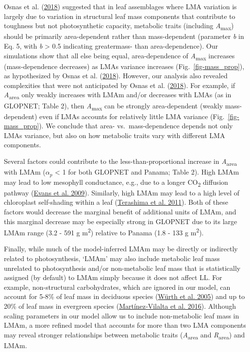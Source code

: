 \documentclass[
  12pt,
  letterpaper,
  DIV=11,
  numbers=noendperiod]{scrartcl}
\begin{document}
Osnas et al. (\protect\hyperlink{ref-Osnas2018}{2018}) suggested that in
leaf assemblages where LMA variation is largely due to variation in
structural leaf mass components that contribute to toughness but not
photosynthetic capacity, metabolic traits (including
\emph{A}\textsubscript{max}) should be primarily area-dependent rather
than mass-dependent (parameter \emph{b} in Eq. 5, with \emph{b}
\textgreater{} 0.5 indicating greatermass- than area-dependence). Our
simulations show that all else being equal, area-dependence of
\emph{A}\textsubscript{max} increases (mass-dependence decreases) as
LMAs variance increases (Fig.~\ref{fig-mass_prop}), as hypothesized by
Osnas et al. (\protect\hyperlink{ref-Osnas2018}{2018}). However, our
analysis also revealed complexities that were not anticipated by Osnas
et al. (\protect\hyperlink{ref-Osnas2018}{2018}). For example, if
\emph{A}\textsubscript{area} only weakly increases with LMAm and/or
decreases with LMAs (as in GLOPNET; Table 2), then
\emph{A}\textsubscript{max} can be strongly area-dependent (weakly
mass-dependent) even if LMAs accounts for relatively little LMA variance
(Fig.~\ref{fig-mass_prop}). We conclude that area- vs.~mass-dependence
depends not only LMAs variance, but also on how metabolic traits vary
with different LMA components.

Several factors could contribute to the less-than-proportional increase
in \emph{A}\textsubscript{area} with LMAm (\(\alpha_p\) \textless{} 1
for both GLOPNET and Panama; Table 2). High LMAm may lead to low
mesophyll conductance, e.g., due to a longer CO\textsubscript{2}
diffusion pathway (\protect\hyperlink{ref-Evans2009}{Evans et al.
2009}). Similarly, high LMAm may lead to a high level of chloroplast
self-shading within a leaf
(\protect\hyperlink{ref-Terashima2011}{Terashima et al. 2011}). Both of
these factors would decrease the marginal benefit of additional units of
LMAm, and this marginal decrease may be especially strong in GLOPNET due
to its large LMAm range (3.2 - 591 g m\textsuperscript{2}) relative to
Panama (1.8 - 133 g m\textsuperscript{2}).

Finally, while much of the model-inferred LMAm may be directly or
indirectly related to photosynthesis, `LMAm' may also include metabolic
leaf mass unrelated to photosynthesis and/or non-metabolic leaf mass
that is statistically assigned (by default) to LMAm simply because it
does not affect LL. For example, non-structural carbohydrates, which are
ignored in our model, can account for 5-8\% of leaf mass in deciduous
species (\protect\hyperlink{ref-Wurth2005}{Würth et al. 2005}) and up to
20\% of leaf mass in evergreen species
(\protect\hyperlink{ref-Martinez-Vilalta2016}{Martínez‐Vilalta et al.
2016}). Although scaling parameters in our model allow us to include
non-metabolic leaf mass in LMAm, a more refined model that accounts for
more than two LMA components may reveal stronger relationships between
metabolic traits (\emph{A}\textsubscript{area} and
\emph{R}\textsubscript{area}) and LMAm.
\end{document}
